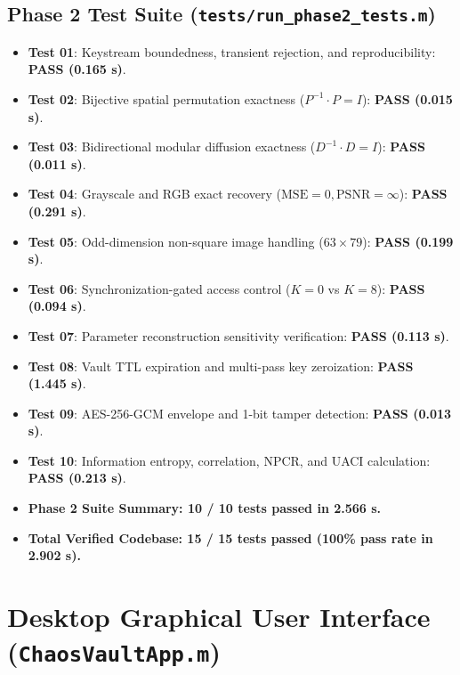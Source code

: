 \documentclass[12pt,a4paper,oneside]{report}
\begin{document}
\section{Phase 2 Test Suite (\texttt{tests/run\_phase2\_tests.m})}
\begin{itemize}
    \item \textbf{Test 01}: Keystream boundedness, transient rejection, and reproducibility: \textbf{PASS (0.165 s)}.
    \item \textbf{Test 02}: Bijective spatial permutation exactness ($P^{-1} \cdot P = I$): \textbf{PASS (0.015 s)}.
    \item \textbf{Test 03}: Bidirectional modular diffusion exactness ($D^{-1} \cdot D = I$): \textbf{PASS (0.011 s)}.
    \item \textbf{Test 04}: Grayscale and RGB exact recovery ($\text{MSE} = 0, \text{PSNR} = \infty$): \textbf{PASS (0.291 s)}.
    \item \textbf{Test 05}: Odd-dimension non-square image handling ($63 \times 79$): \textbf{PASS (0.199 s)}.
    \item \textbf{Test 06}: Synchronization-gated access control ($K=0$ vs $K=8$): \textbf{PASS (0.094 s)}.
    \item \textbf{Test 07}: Parameter reconstruction sensitivity verification: \textbf{PASS (0.113 s)}.
    \item \textbf{Test 08}: Vault TTL expiration and multi-pass key zeroization: \textbf{PASS (1.445 s)}.
    \item \textbf{Test 09}: AES-256-GCM envelope and 1-bit tamper detection: \textbf{PASS (0.013 s)}.
    \item \textbf{Test 10}: Information entropy, correlation, NPCR, and UACI calculation: \textbf{PASS (0.213 s)}.
    \item \textbf{Phase 2 Suite Summary: 10 / 10 tests passed in 2.566 s.}
    \item \textbf{Total Verified Codebase: 15 / 15 tests passed (100\% pass rate in 2.902 s).}
\end{itemize}

\chapter{Desktop Graphical User Interface (\texttt{ChaosVaultApp.m})}
\end{document}
